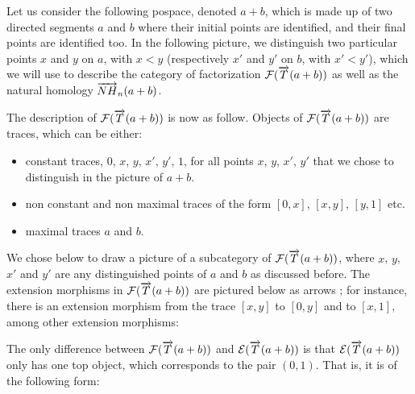Let us consider the following pospace, denoted $a+b$, which is made up
of two directed segments $a$ and $b$ where their initial points are
identified, and their final points are identified too. In the following
picture, we distinguish two particular points $x$
and $y$ on $a$, with $x < y$ (respectively $x'$ and $y'$ on $b$, with
$x' < y'$), which we will use
to describe the category of factorization $\mathcal{F}(\overrightarrow{T}(a+b))$ as well as the
natural homology $\overrightarrow{NH}_{n}(a+b)$. 
	\begin{figure}[H]
		\begin{center}
    			
  		\end{center}
	\end{figure}
The description of $\mathcal{F}(\overrightarrow{T}(a+b))$ is now as follow. Objects of $\mathcal{F}(\overrightarrow{T}(a+b))$ are
traces, which can be either:
\begin{itemize}
	\item constant traces, $0$, $x$, $y$, $x'$, $y'$, $1$, for all points $x$, $y$, $x'$, $y'$ that we chose to distinguish in the picture of $a+b$.
	\item non constant and non maximal traces of the form $[0,x]$, $[x,y]$, $[y,1]$ etc.
	\item maximal traces $a$ and $b$.
\end{itemize}
We chose below to draw a picture of a subcategory of $\mathcal{F}(\overrightarrow{T}(a+b))$, where $x$, $y$, $x'$ and $y'$ are any distinguished points of $a$ and $b$ as discussed before. The extension morphisms in $\mathcal{F}(\overrightarrow{T}(a+b))$ are pictured below as arrows ; for instance, there is an extension morphism from the trace $[x,y]$ to $[0,y]$ and to $[x,1]$, among other extension morphisms: 
	\begin{figure}[H]
		\begin{center}
    			
  		\end{center}
	\end{figure}
	
The only difference between $\mathcal{F}(\overrightarrow{T}(a+b))$ and $\mathcal{E}(\overrightarrow{T}(a+b))$ is that $\mathcal{E}(\overrightarrow{T}(a+b))$ only has one top object, which corresponds to the pair $(0,1)$. That is, it is of the following form:
	\begin{figure}[H]
		\begin{center}
    			
  		\end{center}
	\end{figure}
	
